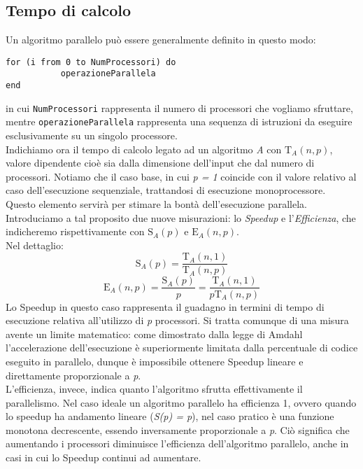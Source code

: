 \subsection{Tempo di calcolo}
Un algoritmo parallelo può essere generalmente definito in questo modo:
\begin{verbatim}
for (i from 0 to NumProcessori) do
           operazioneParallela
end
\end{verbatim}
in cui \texttt{NumProcessori} rappresenta il numero di processori che vogliamo sfruttare, mentre \texttt{operazioneParallela} rappresenta una sequenza di istruzioni da eseguire esclusivamente su un singolo processore.\\
Indichiamo ora il tempo di calcolo legato ad un algoritmo \textit{A} con $\mathrm{T}_{A}(n, p)$, valore dipendente cioè sia dalla dimensione dell'input che dal numero di processori. Notiamo che il caso base, in cui \textit{p = 1} coincide con il valore relativo al caso dell'esecuzione sequenziale, trattandosi di esecuzione monoprocessore. Questo elemento servirà per stimare la bontà dell'esecuzione parallela.\\
Introduciamo a tal proposito due nuove misurazioni: lo \textit{Speedup} e l'\textit{Efficienza}, che indicheremo rispettivamente con $\mathrm{S}_{A}(p)$ e $\mathrm{E}_{A}(n, p)$.\\
Nel dettaglio:
\begin{equation}
\mathrm{S}_{A}(p) = \frac{\mathrm{T}_{A}(n, 1)}{\mathrm{T}_{A}(n, p)}
\end{equation}
\begin{equation}
\mathrm{E}_{A}(n, p) = \frac{\mathrm{S}_{A}(p)}{p} = \frac{\mathrm{T}_{A}(n, 1)}{p\mathrm{T}_{A}(n, p)}
\end{equation}
Lo Speedup in questo caso rappresenta il guadagno in termini di tempo di esecuzione relativa all'utilizzo di \textit{p} processori. Si tratta comunque di una misura avente un limite matematico: come dimostrato dalla legge di Amdahl l'accelerazione dell'esecuzione è superiormente limitata dalla percentuale di codice eseguito in parallelo, dunque è impossibile ottenere Speedup lineare e direttamente proporzionale a \textit{p}.\\
L'efficienza, invece, indica quanto l'algoritmo sfrutta effettivamente il parallelismo. Nel caso ideale un algoritmo parallelo ha efficienza 1, ovvero quando lo speedup ha andamento lineare (\textit{S(p) = p}), nel caso pratico è una funzione monotona decrescente, essendo inversamente proporzionale a \textit{p}. Ciò significa che aumentando i processori diminuisce l'efficienza dell'algoritmo parallelo, anche in casi in cui lo Speedup continui ad aumentare.\\
